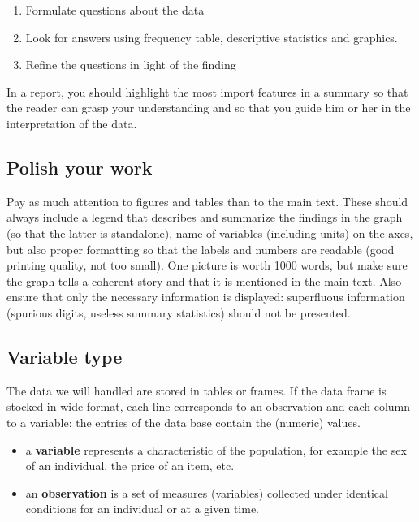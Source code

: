 \documentclass[
  11pt,
  letterpaper,
]{book}
\providecommand{\tightlist}{%
  \setlength{\itemsep}{0pt}\setlength{\parskip}{0pt}}
\theoremstyle{definition}
\theoremstyle{definition}
\theoremstyle{definition}
\theoremstyle{remark}
\begin{document}
\begin{enumerate}
\def\labelenumi{\arabic{enumi}.}
\tightlist
\item
  Formulate questions about the data
\item
  Look for answers using frequency table, descriptive statistics and graphics.
\item
  Refine the questions in light of the finding
\end{enumerate}

In a report, you should highlight the most import features in a summary so that the reader can grasp your understanding and so that you guide him or her in the interpretation of the data.

\hypertarget{polish-your-work}{%
\subsection{Polish your work}\label{polish-your-work}}

Pay as much attention to figures and tables than to the main text. These should always include a legend that describes and summarize the findings in the graph (so that the latter is standalone), name of variables (including units) on the axes, but also proper formatting so that the labels and numbers are readable (good printing quality, not too small). One picture is worth 1000 words, but make sure the graph tells a coherent story and that it is mentioned in the main text. Also ensure that only the necessary information is displayed: superfluous information (spurious digits, useless summary statistics) should not be presented.

\hypertarget{variable-type}{%
\subsection{Variable type}\label{variable-type}}

The data we will handled are stored in tables or frames. If the data frame is stocked in wide format, each line corresponds to an observation and each column to a variable: the entries of the data base contain the (numeric) values.

\begin{itemize}
\tightlist
\item
  a \textbf{variable} represents a characteristic of the population, for example the sex of an individual, the price of an item, etc.
\item
  an \textbf{observation} is a set of measures (variables) collected under identical conditions for an individual or at a given time.
\end{itemize}
\end{document}
